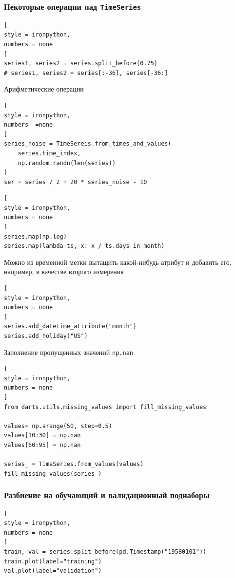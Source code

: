 \documentclass[%
	11pt,
	a4paper,
	utf8,
		]{article}
\begin{document}
\subsubsection{Некоторые операции над \texttt{TimeSeries}}

\begin{lstlisting}[
style = ironpython,
numbers = none
]
series1, series2 = series.split_before(0.75)
# series1, series2 = series[:-36], series[-36:]
\end{lstlisting}

Арифметические операции
\begin{lstlisting}[
style = ironpython,
numbers  =none
]
series_noise = TimeSereis.from_times_and_values(
    series.time_index,
    np.random.randn(len(series))
)
ser = series / 2 + 20 * series_noise - 10
\end{lstlisting}

\begin{lstlisting}[
style = ironpython,
numbers = none
]
series.map(np.log)
series.map(lambda ts, x: x / ts.days_in_month)
\end{lstlisting}

Можно из временной метки вытащить какой-нибудь атрибут и добавить его, например, в качестве второго измерения
\begin{lstlisting}[
style = ironpython,
numbers = none
]
series.add_datetime_attribute("month")
series.add_holiday("US")
\end{lstlisting}

Заполнение пропущенных значений \verb|np.nan|
\begin{lstlisting}[
style = ironpython,
numbers = none
]
from darts.utils.missing_values import fill_missing_values

values= np.arange(50, step=0.5)
values[10:30] = np.nan
values[60:95] = np.nan

series_ = TimeSeries.from_values(values)
fill_missing_values(series_)
\end{lstlisting}

\subsubsection{Разбиение на обучающий и валидационный поднаборы}

\begin{lstlisting}[
style = ironpython,
numbers = none
]
train, val = series.split_before(pd.Timestamp("19580101"))
train.plot(label="training")
val.plot(label="validation")
\end{lstlisting}
\end{document}
